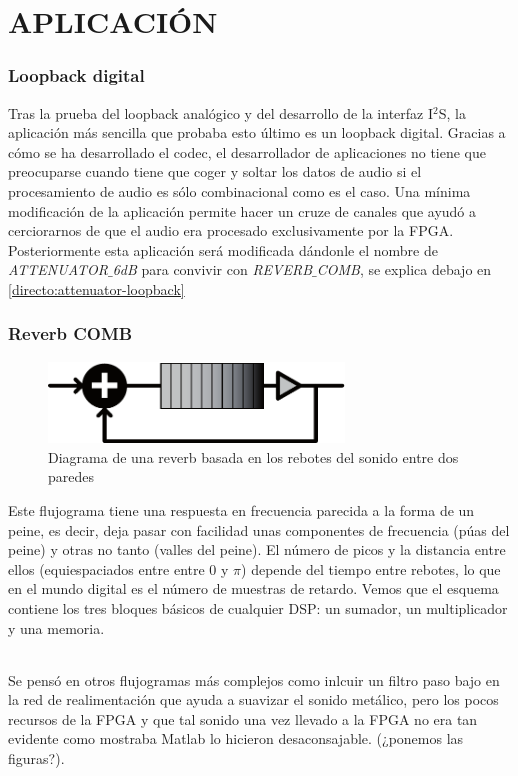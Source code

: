 \part{APLICACIÓN}

\section{Loopback digital}
	Tras la prueba del loopback analógico y del desarrollo de la interfaz I$^2$S, la  aplicación más sencilla que probaba esto último es un loopback digital. Gracias a cómo se ha desarrollado el codec, el desarrollador de aplicaciones no tiene que preocuparse cuando tiene que coger y soltar los datos de audio si el procesamiento de audio es sólo combinacional como es el caso.
	Una mínima modificación de la aplicación permite hacer un cruze de canales que ayudó a cerciorarnos de que el audio era procesado exclusivamente por la FPGA. Posteriormente esta aplicación será modificada dándonle el nombre de \emph{ATTENUATOR$\_$6dB} para convivir con \emph{REVERB$\_$COMB}, se explica debajo en \ref{directo:attenuator-loopback}

\section{Reverb COMB}
\begin{figure}[h]
\begin{center}
	\includegraphics[width=0.7\textwidth]{./reverb_simple_diagram-eps-converted-to}
\caption{Diagrama de una reverb basada en los rebotes del sonido entre dos paredes}
\end{center}
\end{figure}
	Este flujograma tiene una respuesta en frecuencia parecida a la forma de un peine, es decir, deja pasar con facilidad unas componentes de frecuencia (púas del peine) y otras no tanto (valles del peine). El número de picos y la distancia entre ellos (equiespaciados entre entre 0 y $\pi$) depende del tiempo entre rebotes, lo que en el mundo digital es el número de muestras de retardo. Vemos que el esquema contiene los tres bloques básicos de cualquier DSP: un sumador, un multiplicador y una memoria.
	
\paragraph{} Se pensó en otros flujogramas más complejos como inlcuir un filtro paso bajo en la red de realimentación que ayuda a suavizar el sonido metálico, pero los pocos recursos de la FPGA y que tal sonido una vez llevado a la FPGA no era tan evidente como mostraba Matlab lo hicieron desaconsajable. (¿ponemos las figuras?).
